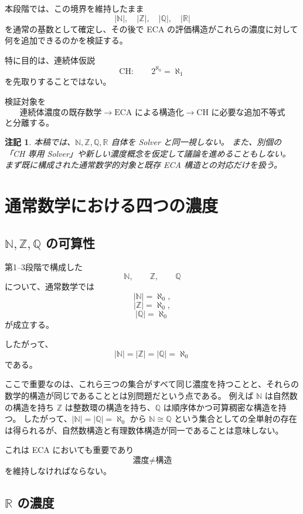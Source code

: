 \documentclass[a4paper,11pt]{article}
\newtheorem{remark}[definition]{注記}
\newcommand{\N}{\mathbb{N}}
\newcommand{\Z}{\mathbb{Z}}
\newcommand{\Q}{\mathbb{Q}}
\newcommand{\R}{\mathbb{R}}
\begin{document}
本段階では、この境界を維持したまま
\[
|\N|,\quad |\Z|,\quad |\Q|,\quad |\R|
\]
を通常の基数として確定し、その後で ECA の評価構造がこれらの濃度に対して何を追加できるのかを検証する。

特に目的は、連続体仮説
\[
\mathrm{CH}:\qquad 2^{\aleph_0}=\aleph_1
\]
を先取りすることではない。

検証対象を
\[
\boxed{
\text{連続体濃度の既存数学}
\longrightarrow
\text{ECA による構造化}
\longrightarrow
\text{CH に必要な追加不等式}
}
\]
と分離する。

\begin{remark}
本稿では、$\mathbb{N},\mathbb{Z},\mathbb{Q},\mathbb{R}$ 自体を Solver と同一視しない。
また、別個の「CH 専用 Solver」や新しい濃度概念を仮定して議論を進めることもしない。
まず既に構成された通常数学的対象と既存 ECA 構造との対応だけを扱う。
\end{remark}

\section{通常数学における四つの濃度}

\subsection{$\mathbb{N},\mathbb{Z},\mathbb{Q}$ の可算性}

第1--3段階で構成した
\[
\N,\qquad \Z,\qquad \Q
\]
について、通常数学では
\[
|\N|=\aleph_0,
\]
\[
|\Z|=\aleph_0,
\]
\[
|\Q|=\aleph_0
\]
が成立する。

したがって、
\[
\boxed{
|\N|=|\Z|=|\Q|=\aleph_0
}
\]
である。

ここで重要なのは、これら三つの集合がすべて同じ濃度を持つことと、それらの数学的構造が同じであることとは別問題だという点である。
例えば $\N$ は自然数の構造を持ち $\Z$ は整数環の構造を持ち、$\Q$ は順序体かつ可算稠密な構造を持つ。
したがって、$|\N|=|\Q|=\aleph_0$ から $\N\cong\Q$ という集合としての全単射の存在は得られるが、自然数構造と有理数体構造が同一であることは意味しない。

これは ECA においても重要であり
\[
\boxed{
\text{濃度}
\neq
\text{構造}
}
\]
を維持しなければならない。

\subsection{$\mathbb{R}$ の濃度}
\end{document}

